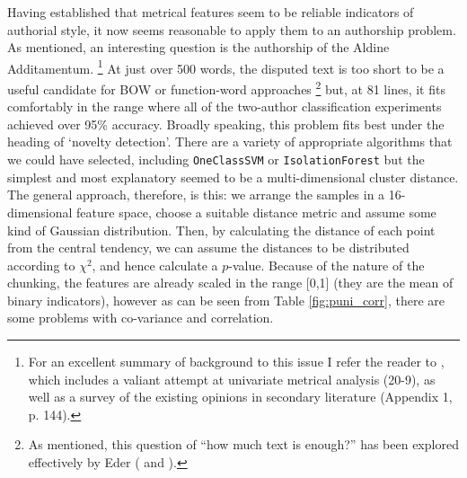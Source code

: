 \documentclass[11pt,a4paper]{scrartcl} %
\begin{document}
{Having established that metrical features seem to be reliable indicators of authorial style, it now seems reasonable to apply them to an authorship problem. As mentioned, an interesting question is the authorship of the Aldine Additamentum.%
\footnote{For an excellent summary of background to this issue I refer the reader to , which includes a valiant attempt at univariate metrical analysis (20-9), as well as a survey of the existing opinions in secondary literature (Appendix 1, p. 144).}
At just over 500 words, the disputed text is too short to be a useful candidate for BOW or function-word approaches%
\footnote{As mentioned, this question of ``how much text is enough?'' has been explored effectively by Eder ( and ).}
but, at 81 lines, it fits comfortably in the range where all of the two-author classification experiments achieved over 95\% accuracy. Broadly speaking, this problem fits best under the heading of `novelty detection'. There are a variety of appropriate algorithms that we could have selected, including \texttt{OneClassSVM} or \texttt{IsolationForest} but the simplest and most explanatory seemed to be a multi-dimensional cluster distance. The general approach, therefore, is this: we arrange the samples in a 16-dimensional feature space, choose a suitable distance metric and assume some kind of Gaussian distribution. Then, by calculating the distance of each point from the central tendency, we can assume the distances to be distributed according to $\chi^{2}$, and hence calculate a $p$-value. Because of the nature of the chunking, the features are already scaled in the range [0,1] (they are the mean of binary indicators), however as can be seen from Table \ref{fig:puni_corr}, there are some problems with co-variance and correlation.
\begin{table}
\caption{Some highly correlated features in Silius' \textit{Punica}}
\label{fig:puni_corr}
\phantom{x}
\centering
{}
\end{table}}
\end{document}

